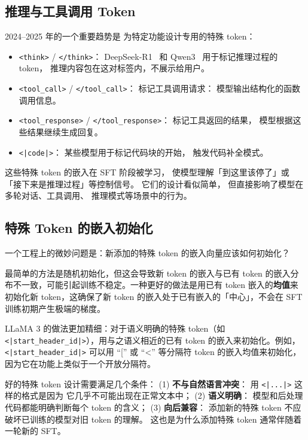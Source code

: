 \subsection{推理与工具调用 Token}

2024--2025 年的一个重要趋势是
为特定功能设计专用的特殊 token：

\begin{itemize}[noitemsep]
  \item \texttt{<think>} / \texttt{</think>}：
        DeepSeek-R1~\cite{deepseekr1} 和 Qwen3~\cite{qwen2025qwen3}
        用于标记推理过程的 token，
        推理内容包在这对标签内，不展示给用户。
  \item \texttt{<tool\_call>} / \texttt{</tool\_call>}：
        标记工具调用请求：
        模型输出结构化的函数调用信息。
  \item \texttt{<tool\_response>} / \texttt{</tool\_response>}：
        标记工具返回的结果，
        模型根据这些结果继续生成回复。
  \item \texttt{<|code|>}：
        某些模型用于标记代码块的开始，
        触发代码补全模式。
\end{itemize}

这些特殊 token 的嵌入在 SFT 阶段被学习，
使模型理解「到这里该停了」或
「接下来是推理过程」等控制信号。
它们的设计看似简单，
但直接影响了模型在多轮对话、工具调用、
推理模式等场景中的行为。

\subsection{特殊 Token 的嵌入初始化}

一个工程上的微妙问题是：新添加的特殊 token 的嵌入向量应该如何初始化？

最简单的方法是随机初始化，但这会导致新 token 的嵌入与已有 token 的嵌入分布不一致，可能引起训练不稳定。一种更好的做法是用已有 token 嵌入的\textbf{均值}来初始化新 token，这确保了新 token 的嵌入处于已有嵌入的「中心」，不会在 SFT 训练初期产生极端的梯度。

LLaMA 3 的做法更加精细：对于语义明确的特殊 token（如 \texttt{<|start\_header\_id|>}），用与之语义相近的已有 token 的嵌入来初始化。例如，\texttt{<|start\_header\_id|>} 可以用 “[” 或 “<” 等分隔符 token 的嵌入均值来初始化，因为它在功能上类似于一个开放分隔符。

\begin{corebox}
好的特殊 token 设计需要满足几个条件：
(1) \textbf{不与自然语言冲突}：
用 \texttt{<|...|>} 这样的格式是因为
它几乎不可能出现在正常文本中；
(2) \textbf{语义明确}：
模型和后处理代码都能明确判断每个 token 的含义；
(3) \textbf{向后兼容}：
添加新的特殊 token 不应破坏已训练的模型对旧 token 的理解。
这也是为什么添加特殊 token 通常伴随着一轮新的 SFT。
\end{corebox}

